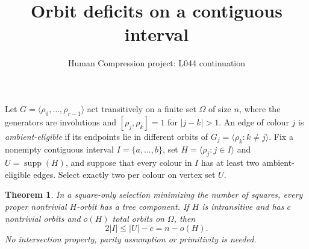 \documentclass[11pt,a4paper]{article}
\title{Orbit deficits on a contiguous interval}
\author{Human Compression project: L044 continuation}
\date{}
\newtheorem{theorem}{Theorem}
\newcommand{\gen}[1]{\langle#1\rangle}
\begin{document}
\maketitle
Let $G=\gen{\rho_0,\ldots,\rho_{r-1}}$ act transitively on a
finite set $\Omega$ of size $n$, where the generators are involutions
and $[\rho_j,\rho_k]=1$ for $|j-k|>1$. An edge of colour $j$
is \emph{ambient-eligible} if its endpoints lie in different orbits
of $G_j=\gen{\rho_k:k\ne j}$.
Fix a nonempty contiguous interval $I=\{a,\ldots,b\}$, set
$H=\gen{\rho_j:j\in I}$ and $U=\operatorname{supp}(H)$, and
suppose that every colour in $I$ has at least two ambient-eligible
edges. Select exactly two per colour on vertex set $U$.

\begin{theorem}\label{interval}
In a square-only selection minimizing the number of squares,
every proper nontrivial $H$-orbit has a tree component. If $H$
is intransitive and has $c$ nontrivial orbits and $o(H)$ total
orbits on $\Omega$, then
\[
  2|I|\leq |U|-c=n-o(H).                              \tag{1}
\]
No intersection property, parity assumption or primitivity is needed.
\end{theorem}
\end{document}
